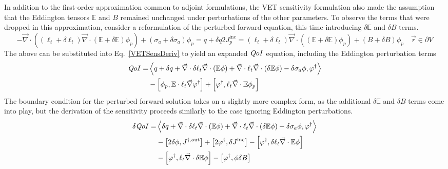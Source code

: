\documentclass[12pt]{report}
\newcommand{\vr}{\vec{r}}
\newcommand{\bra}{\left\langle}
\newcommand{\ket}{\right\rangle}
\newcommand{\sbra}{\left[}
\newcommand{\sket}{\right]}
\renewcommand{\div}{\vec{\nabla} \cdot}
\newcommand{\grad}{\vec{\nabla}}
\newcommand{\vefadj}{\varphi^\dag}
\newcommand{\Edd}{\mathbb{E}}
\newcommand{\BEdd}{B}
\newcommand{\siga}{\sigma_a}
\newcommand{\isigt}{\ell_t}
\newcommand{\scalSource}{q}
\newcommand{\qoi}{{\it QoI}\xspace}
\begin{document}
In addition to the first-order approximation common to adjoint formulations, the VET sensitivity formulation also made the assumption that the Eddington tensors $\Edd$ and $B$ remained unchanged under perturbations of the other parameters. To observe the terms that were dropped in this approximation, consider a reformulation of the perturbed forward equation, this time introducing $\delta \Edd$ and $\delta  B$ terms. 
\begin{subequations}
\begin{equation}
\label{VEFPerEdd}
- \div \left((\isigt + \delta \isigt)\div (\Edd + \delta \Edd) \phi_p \right) + (\siga + \delta \siga)\phi_p = \scalSource + \delta \scalSource
\end{equation}
\begin{equation}
2J_p^{\text{inc}} =
(\isigt + \delta \isigt) \vec{\nabla} \cdot \left((\Edd + \delta \Edd) \phi_p \right)  + (\BEdd +\delta \BEdd) \phi_p \quad \vr \in \partial V
\end{equation}
\end{subequations}
The above can be substituted into Eq.~\eqref{VETSensDeriv} to yield an expanded $\qoi$ equation, including the Eddington perturbation terms
\begin{equation}
\label{QoIVETAdjNoBCEdd}
\begin{split}
\qoi =& \bra \scalSource + \delta \scalSource + \div \delta \isigt \div \left( \Edd \phi \right) + \div \isigt \div \left( \delta \Edd \phi \right) - \delta \siga \phi, \vefadj \ket \\
&- \sbra \phi_p, \Edd \cdot \isigt \grad \vefadj \sket 
+ \sbra \vefadj , \isigt \div \Edd \phi_p \sket
\end{split}
\end{equation}
The boundary condition for the perturbed forward solution takes on a slightly more complex form, as the additional $\delta \Edd$ and $\delta \BEdd$ terms come into play, but the derivation of the sensitivity proceeds similarly to the case ignoring Eddington perturbations.
\begin{equation}
\label{QoIVETAdjEdd}
\begin{split}
\delta \qoi =& \bra \delta \scalSource + \div \delta \isigt \div \left( \Edd \phi \right) + \div \isigt \div \left( \delta \Edd \phi \right) - \delta \siga \phi, \vefadj \ket \\
&- \sbra 2\delta \phi, J^{\dag, \text{out}} \sket  + \sbra 2 \vefadj, \delta J^{\text{inc}} \sket
- \sbra \vefadj, \delta \isigt \div \Edd \phi \sket
\\
&- \sbra  \vefadj ,\isigt \div \delta \Edd \phi \sket
- \sbra \vefadj, \phi \delta \BEdd \sket
\end{split}
\end{equation} 
\end{document}

